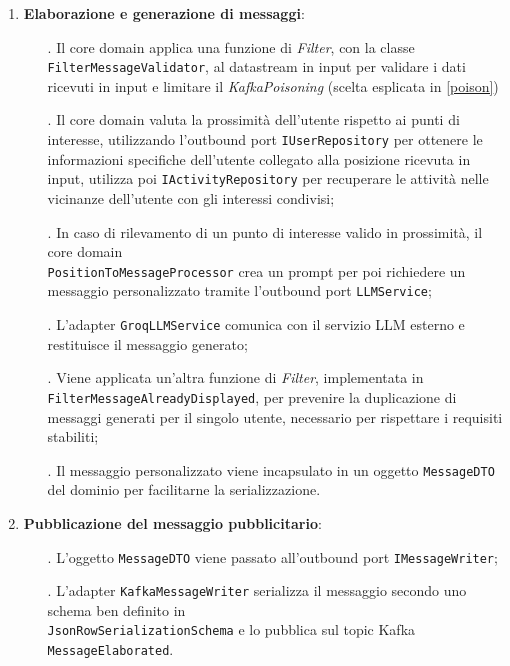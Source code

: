\documentclass[10pt]{article}
\begin{document}
\begin{enumerate}
        \item \textbf{Elaborazione e generazione di messaggi}:
        \begin{itemize}
            \item[.] Il core domain applica una funzione di \textit{Filter}, con la classe \texttt{FilterMessageValidator}, al datastream in input per validare i dati ricevuti in input e limitare il \textit{KafkaPoisoning} (scelta esplicata in \ref{poison})
            \item[.] Il core domain valuta la prossimità dell'utente rispetto ai punti di interesse, utilizzando l'outbound port \texttt{IUserRepository} per ottenere le informazioni specifiche dell'utente collegato alla posizione ricevuta in input, utilizza poi \texttt{IActivityRepository} per recuperare le attività nelle vicinanze dell'utente con gli interessi condivisi;
            \item[.] In caso di rilevamento di un punto di interesse valido in prossimità, il core domain \\\texttt{PositionToMessageProcessor} crea un prompt per poi richiedere un messaggio personalizzato tramite l'outbound port \texttt{LLMService};
            \item[.] L'adapter \texttt{GroqLLMService} comunica con il servizio LLM esterno e restituisce il messaggio generato;
            \item[.] Viene applicata un'altra funzione di \textit{Filter}, implementata in \texttt{FilterMessageAlreadyDisplayed}, per prevenire la duplicazione di messaggi generati per il singolo utente, necessario per rispettare i requisiti stabiliti;
            \item[.] Il messaggio personalizzato viene incapsulato in un oggetto \texttt{MessageDTO} del dominio per facilitarne la serializzazione.
        \end{itemize}

        \item \textbf{Pubblicazione del messaggio pubblicitario}:
        \begin{itemize}
            \item[.] L'oggetto \texttt{MessageDTO} viene passato all'outbound port \texttt{IMessageWriter};
            \item[.] L'adapter \texttt{KafkaMessageWriter} serializza il messaggio secondo uno schema ben definito in \\ \texttt{JsonRowSerializationSchema} e lo pubblica sul topic Kafka \texttt{MessageElaborated}.
        \end{itemize}


\end{enumerate}
\end{document}
